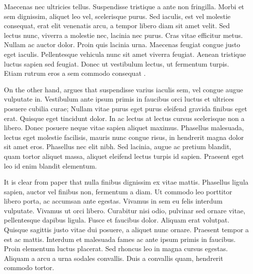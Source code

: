 \maketitle




Maecenas nec ultricies tellus. Suspendisse tristique a ante non fringilla. Morbi et sem dignissim, aliquet leo vel, scelerisque purus. Sed iaculis, est vel molestie consequat, erat elit venenatis arcu, a tempor libero diam sit amet velit. Sed lectus nunc, viverra a molestie nec, lacinia nec purus. Cras vitae efficitur metus. Nullam ac auctor dolor. Proin quis lacinia urna. Maecenas feugiat congue justo eget iaculis. Pellentesque vehicula nunc sit amet viverra feugiat. Aenean tristique luctus sapien sed feugiat. Donec ut vestibulum lectus, ut fermentum turpis. Etiam rutrum eros a sem commodo consequat \parencite{ludtke:2008}.

On the other hand, \textcite{marsh:2009} argues that suspendisse varius iaculis sem, vel congue augue vulputate in. Vestibulum ante ipsum primis in faucibus orci luctus et ultrices posuere cubilia curae; Nullam vitae purus eget purus eleifend gravida finibus eget erat. Quisque eget tincidunt dolor. In ac lectus at lectus cursus scelerisque non a libero. Donec posuere neque vitae sapien aliquet maximus. Phasellus malesuada, lectus eget molestie facilisis, mauris nunc congue risus, in hendrerit magna dolor sit amet eros. Phasellus nec elit nibh. Sed lacinia, augue ac pretium blandit, quam tortor aliquet massa, aliquet eleifend lectus turpis id sapien. Praesent eget leo id enim blandit elementum.

It is clear from  paper that nulla finibus dignissim ex vitae mattis. Phasellus ligula sapien, auctor vel finibus non, fermentum a diam. Ut commodo leo porttitor libero porta, ac accumsan ante egestas. Vivamus in sem eu felis interdum vulputate. Vivamus ut orci libero. Curabitur nisi odio, pulvinar sed ornare vitae, pellentesque dapibus ligula. Fusce et faucibus dolor. Aliquam erat volutpat. Quisque sagittis justo vitae dui posuere, a aliquet nunc ornare. Praesent tempor a est ac mattis. Interdum et malesuada fames ac ante ipsum primis in faucibus. Proin elementum luctus placerat. Sed rhoncus leo in magna cursus egestas. Aliquam a arcu a urna sodales convallis. Duis a convallis quam, hendrerit commodo tortor.

